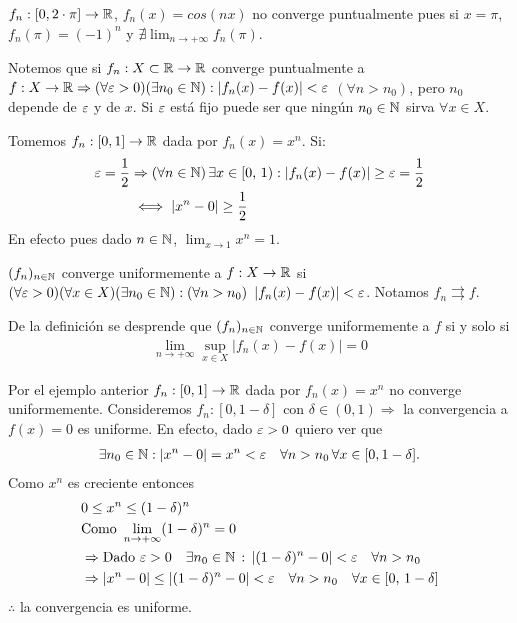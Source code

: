 \begin{eg}
  \(f_n: [0, 2 \cdot \pi] \to \mathbb{R}\), \(f_n(x) = cos(nx)\) no converge puntualmente pues si \(x = \pi\), \(f_n(\pi) = (-1)^n\) y \(\nexists \lim_{n \to +\infty} f_n(\pi)\).
\end{eg}

Notemos que si \(f_n: X \subset \mathbb{R} \to \mathbb{R}\) converge puntualmente a \(f: X \to \mathbb{R} \Rightarrow (\forall \varepsilon > 0)(\exists n_0 \in \mathbb{N}) : |f_n(x) - f(x)| < \varepsilon\) \((\forall n > n_0)\), pero \(n_0\) depende de \(\varepsilon\) y de \(x\). Si \(\varepsilon\) está fijo puede ser que ningún \(n_0 \in \mathbb{N}\) sirva \(\forall x \in X\).

\begin{eg}
  Tomemos \(f_n: [0, 1] \to \mathbb{R}\) dada por \(f_n(x) = x^n\). Si: \begin{align*}
    \varepsilon = \frac{1}{2} & \Rightarrow (\forall n \in \mathbb{N}) \, \exists x \in [0\text{, }1) : |f_n(x) - f(x)| \geq \varepsilon = \frac{1}{2} \\
                     & \iff |x^n - 0| \geq \frac{1}{2}
  \end{align*}
  En efecto pues dado \(n \in \mathbb{N}\), \(\lim_{x \to 1} x^n = 1\).
\end{eg}

\begin{definition}
  \((f_n)_{n \in \mathbb{N}}\) converge uniformemente a \(f: X \to \mathbb{R}\) si \((\forall \varepsilon > 0)(\forall x \in X)(\exists n_0 \in \mathbb{N}) : (\forall n > n_0)\) \(|f_n(x) - f(x)| < \varepsilon\). Notamos \(f_n \rightrightarrows f\).
\end{definition}

De la definición se desprende que \((f_n)_{n \in \mathbb{N}}\) converge uniformemente a \(f\) si y solo si \begin{align*}
  \lim_{n \to +\infty} \sup_{x \in X} |f_n(x) - f(x)| = 0
\end{align*}

\begin{eg}
  Por el ejemplo anterior \(f_n: [0, 1] \to \mathbb{R}\) dada por \(f_n(x) = x^n\) no converge uniformemente.
  Consideremos \(f_n: [0, 1 - \delta]\) con \(\delta \in (0, 1) \Rightarrow\) la convergencia a \(f(x) = 0\) es uniforme.
  En efecto, dado \(\varepsilon > 0\) quiero ver que
  \begin{align*}
    \exists n_0 \in \mathbb{N} : |x^n - 0| = x^n < \varepsilon \quad \forall n > n_0 \, \forall x \in [0, 1 - \delta].
  \end{align*}
  Como \(x^n\) es creciente entonces
  \begin{align*}
     & 0 \leq x^n \leq (1 - \delta)^n                                                                                      \\
     & \text{Como } \lim_{n \to +\infty} (1 - \delta)^n = 0                                                                \\
     & \Rightarrow \text{Dado } \varepsilon > 0 \quad \exists n_0 \in \mathbb{N} \, : \, |(1 - \delta)^n - 0 | < \varepsilon \quad \forall n > n_0   \\
     & \Rightarrow |x^n - 0| \leq |(1 - \delta)^n - 0| < \varepsilon \quad \forall n > n_0 \quad \forall x \in [0\text{, }1-\delta]
  \end{align*}
  \(\therefore\) la convergencia es uniforme.
\end{eg}

